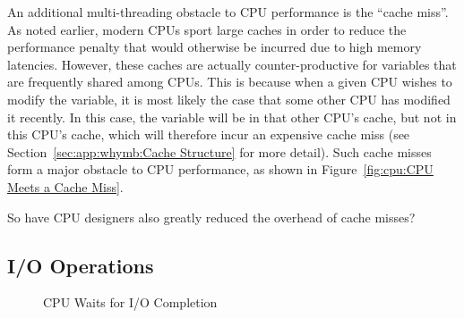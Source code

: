 An additional multi-threading obstacle to CPU performance is
the ``cache miss''.
As noted earlier, modern CPUs sport large caches in order to reduce the
performance penalty that would otherwise be incurred due to high memory
latencies.
However, these caches are actually counter-productive for variables that
are frequently shared among CPUs.
This is because when a given CPU wishes to modify the variable, it is
most likely the case that some other CPU has modified it recently.
In this case, the variable will be in that other CPU's cache, but not
in this CPU's cache, which will therefore incur an expensive cache miss
(see Section~\ref{sec:app:whymb:Cache Structure} for more detail).
Such cache misses form a major obstacle to CPU performance, as shown
in Figure~\ref{fig:cpu:CPU Meets a Cache Miss}.

\QuickQuiz{}
	So have CPU designers also greatly reduced the overhead of
	cache misses?
 \QuickQuizEnd

\subsection{I/O Operations}
\label{sec:cpu:I/O Operations}

\begin{figure}[tb]
\begin{center}
\end{center}
\caption{CPU Waits for I/O Completion}
\end{figure}

